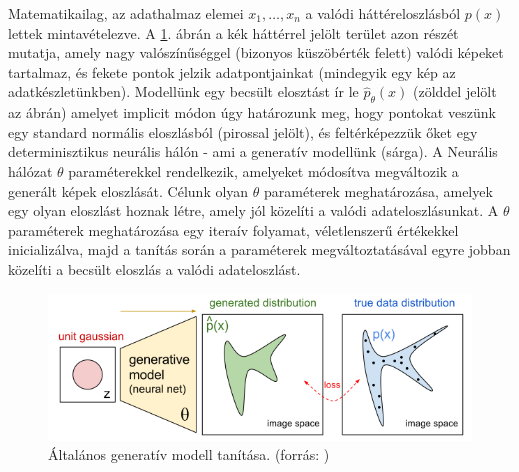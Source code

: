 Matematikailag, az adathalmaz elemei $x_1, \dots, x_n$ a valódi háttéreloszlásból $p(x)$ lettek mintavételezve. A \ref{fig:data_distribution}. ábrán a kék háttérrel jelölt terület azon részét mutatja, amely nagy valószínűséggel (bizonyos küszöbérték felett) valódi képeket tartalmaz, és fekete pontok jelzik adatpontjainkat (mindegyik egy kép az adatkészletünkben). Modellünk egy becsült elosztást ír le $\hat{p}_{\theta}(x)$ (zölddel jelölt az ábrán) amelyet implicit módon úgy határozunk meg, hogy pontokat veszünk egy standard normális eloszlásból (pirossal jelölt), és feltérképezzük őket egy determinisztikus neurális hálón - ami a generatív modellünk (sárga). A Neurális hálózat $\theta$ paraméterekkel rendelkezik, amelyeket módosítva megváltozik a generált képek eloszlását. Célunk olyan $\theta$ paraméterek meghatározása, amelyek egy olyan eloszlást hoznak létre, amely jól közelíti a valódi adateloszlásunkat. A $\theta$ paraméterek meghatározása egy iteraív folyamat, véletlenszerű értékekkel inicializálva, majd a tanítás során a paraméterek megváltoztatásával egyre jobban közelíti a becsült eloszlás a valódi adateloszlást.

\begin{figure}[ht]
	\centering
	\includegraphics[width=1\columnwidth]{figures/generative_model_math.png}
	\caption{Általános generatív modell tanítása. (forrás: \cite{fig:generative_model_math})}
	\label{fig:data_distribution}
\end{figure}


